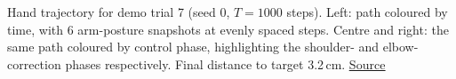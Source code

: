 Hand trajectory for demo trial 7 (seed 0, $T=1000$ steps). Left: path coloured by time, with 6 arm-posture snapshots at evenly spaced steps. Centre and right: the same path coloured by control phase, highlighting the shoulder- and elbow-correction phases respectively. Final distance to target 3.2\,cm. \href{https://github.com/tahmidazam/gg4/blob/main/notebooks/cartesian_control_trajectory/cartesian_control_trajectory.ipynb}{\underline{Source}}%